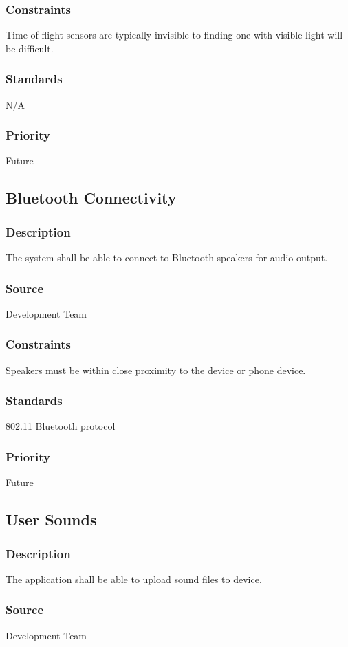 \subsubsection{Constraints}
Time of flight sensors are typically invisible to finding one with visible light will be difficult. 
\subsubsection{Standards}
N/A
\subsubsection{Priority}
Future

\subsection{Bluetooth Connectivity}
\subsubsection{Description}
The system shall be able to connect to Bluetooth speakers for audio output.
\subsubsection{Source}
Development Team
\subsubsection{Constraints}
Speakers must be within close proximity to the device or phone device.
\subsubsection{Standards}
802.11 Bluetooth protocol
\subsubsection{Priority}
Future

\subsection{User Sounds}
\subsubsection{Description}
The application shall be able to upload sound files to device.
\subsubsection{Source}
Development Team
